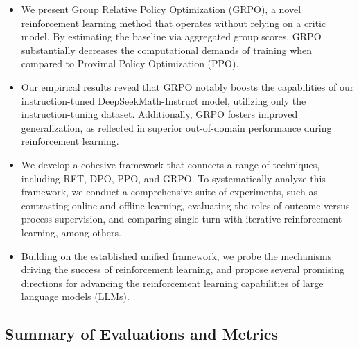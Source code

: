 \begin{itemize}[topsep=0pt]
    \item We present Group Relative Policy Optimization (GRPO), a novel reinforcement learning method that operates without relying on a critic model. By estimating the baseline via aggregated group scores, GRPO substantially decreases the computational demands of training when compared to Proximal Policy Optimization (PPO).
    \item Our empirical results reveal that GRPO notably boosts the capabilities of our instruction-tuned DeepSeekMath-Instruct model, utilizing only the instruction-tuning dataset. Additionally, GRPO fosters improved generalization, as reflected in superior out-of-domain performance during reinforcement learning.
    \item We develop a cohesive framework that connects a range of techniques, including RFT, DPO, PPO, and GRPO. To systematically analyze this framework, we conduct a comprehensive suite of experiments, such as contrasting online and offline learning, evaluating the roles of outcome versus process supervision, and comparing single-turn with iterative reinforcement learning, among others.
    \item Building on the established unified framework, we probe the mechanisms driving the success of reinforcement learning, and propose several promising directions for advancing the reinforcement learning capabilities of large language models (LLMs).
\end{itemize}

\subsection{Summary of Evaluations and Metrics}

